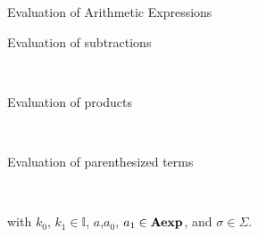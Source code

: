 \documentclass{beamer}
\begin{document}
\begin{frame}{\large Evaluation of Arithmetic Expressions}
\begin{description}
\item[Evaluation of subtractions]\hspace{1in}\\
\begin{prooftree}
 \end{prooftree}

 \item[Evaluation of products]\hspace{1in}\\
\begin{prooftree}
\end{prooftree}

 \item[Evaluation of parenthesized terms]\hspace{1in}\\
\begin{prooftree}
\end{prooftree}
\end{description}

\vspace{.2in}

with $k_0$, $k_1  \in \mathbb{I}$, $a$,$a_0$, $a_1 \in \syntaxset{Aexp}$, and
$\sigma \in \Sigma$.
\end{frame}
\end{document}
